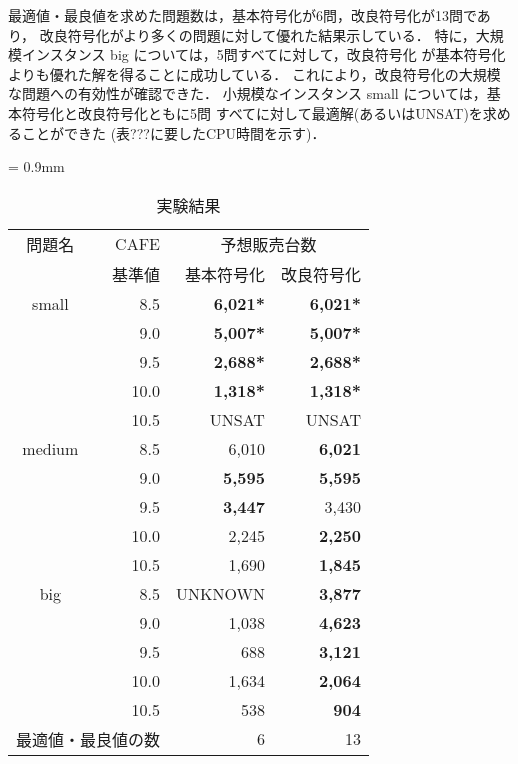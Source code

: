 最適値・最良値を求めた問題数は，基本符号化が6問，改良符号化が13問であり，
改良符号化がより多くの問題に対して優れた結果示している．
特に，大規模インスタンス big については，5問すべてに対して，改良符号化
が基本符号化よりも優れた解を得ることに成功している．
これにより，改良符号化の大規模な問題への有効性が確認できた．
%
小規模なインスタンス small については，基本符号化と改良符号化ともに5問
すべてに対して最適解(あるいは\textsf{UNSAT})を求めることができた
(表???に要したCPU時間を示す)．



\begin{table}[tb]
  \caption{実験結果}
  \centering
  \tabcolsep = 0.9mm
  \begin{tabular}{c|r|rr} \bhline
    問題名 & CAFE & \multicolumn{2}{c}{予想販売台数} \\ \cline{3-4}
           & 基準値 & 基本符号化             & 改良符号化 \\\hline    
    small & 8.5   & \textbf{6,021*}       & \textbf{6,021*}       \\
           & 9.0   & \textbf{5,007*}       & \textbf{5,007*}       \\
           & 9.5   & \textbf{2,688*}       & \textbf{2,688*}       \\
           & 10.0  & \textbf{1,318*}       & \textbf{1,318*}       \\
           & 10.5  & \textsf{UNSAT}        & \textsf{UNSAT}       \\ \hline
    medium & 8.5  & 6,010                 & \textbf{6,021}        \\
           & 9.0  & \textbf{5,595}        & \textbf{5,595}        \\
           & 9.5  & \textbf{3,447}        & 3,430                 \\
           & 10.0 & 2,245                 & \textbf{2,250}        \\
           & 10.5 & 1,690                 & \textbf{1,845}        \\ \hline
    big   & 8.5   & \textsf{UNKNOWN}       & \textbf{3,877}        \\
           & 9.0   & 1,038                 & \textbf{4,623}        \\
           & 9.5   & 688                   & \textbf{3,121}        \\
           & 10.0  & 1,634                 & \textbf{2,064}        \\
           & 10.5  & 538                   & \textbf{904}          \\ \hline \hline
    \multicolumn{2}{c}{最適値・最良値の数} & 6 & 13                       \\ \hline
 \end{tabular}
 \label{tab:result}
\end{table}

